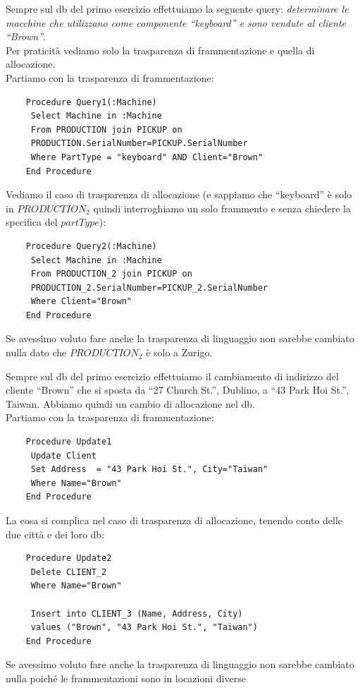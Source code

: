 \documentclass[a4paper,12pt, oneside]{book}
\begin{document}
\begin{esercizio}
  Sempre sul db del primo esercizio effettuiamo la seguente query:
  \textit{determinare le macchine che utilizzano come componente ``keyboard'' e
    sono vendute al cliente ``Brown''}.\\
  Per praticità vediamo solo la trasparenza di frammentazione e quella di
  allocazione.\\
  Partiamo con la trasparenza di frammentazione:
  \begin{verbatim}
    Procedure Query1(:Machine)
     Select Machine in :Machine
     From PRODUCTION join PICKUP on
     PRODUCTION.SerialNumber=PICKUP.SerialNumber
     Where PartType = "keyboard" AND Client="Brown"
    End Procedure
  \end{verbatim}
  Vediamo il caso di trasparenza di allocazione (e sappiamo che ``keyboard'' è
  solo in $PRODUCTION_2$ quindi interroghiamo un solo frammento e senza chiedere
  la specifica del $partType$):
  \begin{verbatim}
    Procedure Query2(:Machine)
     Select Machine in :Machine
     From PRODUCTION_2 join PICKUP on
     PRODUCTION_2.SerialNumber=PICKUP_2.SerialNumber
     Where Client="Brown"
    End Procedure
  \end{verbatim}
  Se avessimo voluto fare anche la trasparenza di linguaggio non sarebbe
  cambiato nulla dato che $PRODUCTION_2$ è solo a Zurigo.
\end{esercizio}
\begin{esercizio}
  Sempre sul db del primo esercizio effettuiamo il cambiamento di indirizzo del
  cliente ``Brown'' che si sposta da ``27 Church St.'', Dublino, a ``43 Park Hoi
  St.'', Taiwan. Abbiamo quindi un cambio di allocazione nel db.\\
  Partiamo con la trasparenza di frammentazione:
  \begin{verbatim}
    Procedure Update1
     Update Client
     Set Address  = "43 Park Hoi St.", City="Taiwan"
     Where Name="Brown"
    End Procedure
  \end{verbatim}
  La cosa si complica nel caso di trasparenza di allocazione, tenendo conto
  delle due città e dei loro db:
  \begin{verbatim}
    Procedure Update2
     Delete CLIENT_2
     Where Name="Brown"
     
     Insert into CLIENT_3 (Name, Address, City)
     values ("Brown", "43 Park Hoi St.", "Taiwan")
    End Procedure
  \end{verbatim}
  Se avessimo voluto fare anche la trasparenza di linguaggio non sarebbe
  cambiato nulla poiché le frammentazioni sono in locazioni diverse
\end{esercizio}
\end{document}
